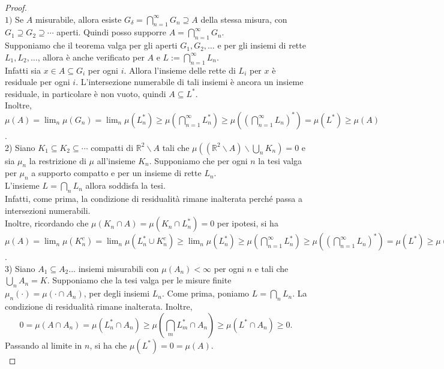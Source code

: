 \documentclass[a4paper, twoside]{article}
\newcommand{\<}{\langle}
\renewcommand{\>}{\rangle}
\begin{document}
\begin{proof} \hfill \\
	$1)$ Se $A$ misurabile, allora esiste $G_{\delta} = \bigcap_{n=1}^{\infty} G_{n} \supseteq A$ della stessa misura, con $G_{1} \supseteq G_{2} \supseteq \cdots$ aperti. Quindi posso supporre $A=\bigcap_{n=1}^{\infty} G_{n}$.\\
	Supponiamo che il teorema valga per gli aperti $G_{1}, G_{2}, \ldots$ e per gli insiemi di rette $L_{1}, L_{2}, \ldots$, allora è anche verificato per  $A$ e $L:=\bigcap_{n=1}^{\infty} L_{n}$.\\
	Infatti sia $x \in A \subseteq G_i$ per ogni $i$. Allora l'insieme delle rette di $L_i$ per $x$ è residuale per ogni $i$. L'intersezione numerabile di tali insiemi è ancora un insieme residuale, in particolare è non vuoto, quindi $A \subseteq L^*$.\\
	Inoltre, $\mu(A) = \lim_n \mu(G_n) = \lim_n \mu(L_n^*) \geq \mu\left(\bigcap_{n=1}^\infty L_n^*\right) \geq \mu\left(\left(\bigcap_{n=1}^\infty L_n\right)^*\right) = \mu(L^*) \geq \mu(A)$. \\

	2) Siano $K_{1} \subseteq K_{2} \subseteq \cdots$ compatti di $\mathbb{R}^{2} \backslash A$ tali che $\mu\left(\left(\mathbb{R}^{2} \backslash A\right) \backslash \bigcup_{n} K_{n}\right)=0$ e sia $\mu_{n}$ la restrizione di $\mu$ all'insieme $K_{n}$. Supponiamo che per ogni $n$ la tesi valga per $\mu_n$ a supporto compatto e per un insieme di rette $L_n$.\\
	L'insieme $L=\bigcap_n L_n$ allora soddisfa la tesi.\\
	Infatti, come prima, la condizione di residualità rimane inalterata perché passa a intersezioni numerabili.\\
	Inoltre, ricordando che $\mu(K_n \cap A)=\mu(K_n \cap L_n^*)=0$ per ipotesi, si ha 
	$\mu(A)=\lim_n\mu(K_n^c)=\lim_n\mu(L_n^* \cup K_n^c) \geq \lim_n \mu(L_n^*) \geq \mu\left(\bigcap_{n=1}^\infty L_n^*\right) \geq \mu\left(\left(\bigcap_{n=1}^\infty L_n\right)^*\right) = \mu(L^*) \geq \mu(A)$.\\

	3) Siano $A_1 \subseteq A_2 ...$ insiemi misurabili con $\mu(A_n) < \infty$ per ogni $n$ e tali che $\bigcup_n A_n=K$. Supponiamo che la tesi valga per le misure finite $\mu_n(\cdot)=\mu( \cdot \cap A_n)$, per degli insiemi $L_n$. Come prima, poniamo $L=\bigcap_n L_n$. La condizione di residualità rimane inalterata. Inoltre,
	$$0= \mu(A \cap A_n)=\mu(L_n^* \cap A_n)\geq\mu(\textstyle\bigcap_mL_m^* \cap A_n) \geq \mu(L^* \cap A_n) \geq 0.$$
	Passando al limite in $n$, si ha che $\mu(L^*)=0=\mu(A)$.\\


\end{proof}
\end{document}
